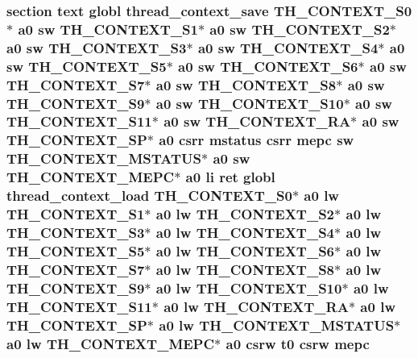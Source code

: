 \hypertarget{riscv_2threada_8S_a70f7baf0c0dae51a1e5b9fa4b8b4d304}{
\subsubsection[{mepc}]{\setlength{\rightskip}{0pt plus 5cm}section text globl {\bf thread\-\_\-context\-\_\-save} {\bf T\-H\-\_\-\-C\-O\-N\-T\-E\-X\-T\-\_\-\-S0}$\ast$ {\bf a0} {\bf sw} {\bf T\-H\-\_\-\-C\-O\-N\-T\-E\-X\-T\-\_\-\-S1}$\ast$ {\bf a0} {\bf sw} {\bf T\-H\-\_\-\-C\-O\-N\-T\-E\-X\-T\-\_\-\-S2}$\ast$ {\bf a0} {\bf sw} {\bf T\-H\-\_\-\-C\-O\-N\-T\-E\-X\-T\-\_\-\-S3}$\ast$ {\bf a0} {\bf sw} {\bf T\-H\-\_\-\-C\-O\-N\-T\-E\-X\-T\-\_\-\-S4}$\ast$ {\bf a0} {\bf sw} {\bf T\-H\-\_\-\-C\-O\-N\-T\-E\-X\-T\-\_\-\-S5}$\ast$ {\bf a0} {\bf sw} {\bf T\-H\-\_\-\-C\-O\-N\-T\-E\-X\-T\-\_\-\-S6}$\ast$ {\bf a0} {\bf sw} {\bf T\-H\-\_\-\-C\-O\-N\-T\-E\-X\-T\-\_\-\-S7}$\ast$ {\bf a0} {\bf sw} {\bf T\-H\-\_\-\-C\-O\-N\-T\-E\-X\-T\-\_\-\-S8}$\ast$ {\bf a0} {\bf sw} {\bf T\-H\-\_\-\-C\-O\-N\-T\-E\-X\-T\-\_\-\-S9}$\ast$ {\bf a0} {\bf sw} {\bf T\-H\-\_\-\-C\-O\-N\-T\-E\-X\-T\-\_\-\-S10}$\ast$ {\bf a0} {\bf sw} {\bf T\-H\-\_\-\-C\-O\-N\-T\-E\-X\-T\-\_\-\-S11}$\ast$ {\bf a0} {\bf sw} {\bf T\-H\-\_\-\-C\-O\-N\-T\-E\-X\-T\-\_\-\-R\-A}$\ast$ {\bf a0} {\bf sw} {\bf T\-H\-\_\-\-C\-O\-N\-T\-E\-X\-T\-\_\-\-S\-P}$\ast$ {\bf a0} csrr {\bf mstatus} csrr mepc {\bf sw} {\bf T\-H\-\_\-\-C\-O\-N\-T\-E\-X\-T\-\_\-\-M\-S\-T\-A\-T\-U\-S}$\ast$ {\bf a0} {\bf sw} {\bf T\-H\-\_\-\-C\-O\-N\-T\-E\-X\-T\-\_\-\-M\-E\-P\-C}$\ast$ {\bf a0} {\bf li} ret globl {\bf thread\-\_\-context\-\_\-load} {\bf T\-H\-\_\-\-C\-O\-N\-T\-E\-X\-T\-\_\-\-S0}$\ast$ {\bf a0} {\bf lw} {\bf T\-H\-\_\-\-C\-O\-N\-T\-E\-X\-T\-\_\-\-S1}$\ast$ {\bf a0} {\bf lw} {\bf T\-H\-\_\-\-C\-O\-N\-T\-E\-X\-T\-\_\-\-S2}$\ast$ {\bf a0} {\bf lw} {\bf T\-H\-\_\-\-C\-O\-N\-T\-E\-X\-T\-\_\-\-S3}$\ast$ {\bf a0} {\bf lw} {\bf T\-H\-\_\-\-C\-O\-N\-T\-E\-X\-T\-\_\-\-S4}$\ast$ {\bf a0} {\bf lw} {\bf T\-H\-\_\-\-C\-O\-N\-T\-E\-X\-T\-\_\-\-S5}$\ast$ {\bf a0} {\bf lw} {\bf T\-H\-\_\-\-C\-O\-N\-T\-E\-X\-T\-\_\-\-S6}$\ast$ {\bf a0} {\bf lw} {\bf T\-H\-\_\-\-C\-O\-N\-T\-E\-X\-T\-\_\-\-S7}$\ast$ {\bf a0} {\bf lw} {\bf T\-H\-\_\-\-C\-O\-N\-T\-E\-X\-T\-\_\-\-S8}$\ast$ {\bf a0} {\bf lw} {\bf T\-H\-\_\-\-C\-O\-N\-T\-E\-X\-T\-\_\-\-S9}$\ast$ {\bf a0} {\bf lw} {\bf T\-H\-\_\-\-C\-O\-N\-T\-E\-X\-T\-\_\-\-S10}$\ast$ {\bf a0} {\bf lw} {\bf T\-H\-\_\-\-C\-O\-N\-T\-E\-X\-T\-\_\-\-S11}$\ast$ {\bf a0} {\bf lw} {\bf T\-H\-\_\-\-C\-O\-N\-T\-E\-X\-T\-\_\-\-R\-A}$\ast$ {\bf a0} {\bf lw} {\bf T\-H\-\_\-\-C\-O\-N\-T\-E\-X\-T\-\_\-\-S\-P}$\ast$ {\bf a0} {\bf lw} {\bf T\-H\-\_\-\-C\-O\-N\-T\-E\-X\-T\-\_\-\-M\-S\-T\-A\-T\-U\-S}$\ast$ {\bf a0} {\bf lw} {\bf T\-H\-\_\-\-C\-O\-N\-T\-E\-X\-T\-\_\-\-M\-E\-P\-C}$\ast$ {\bf a0} csrw {\bf t0} csrw mepc}}\label{riscv_2threada_8S_a70f7baf0c0dae51a1e5b9fa4b8b4d304}
